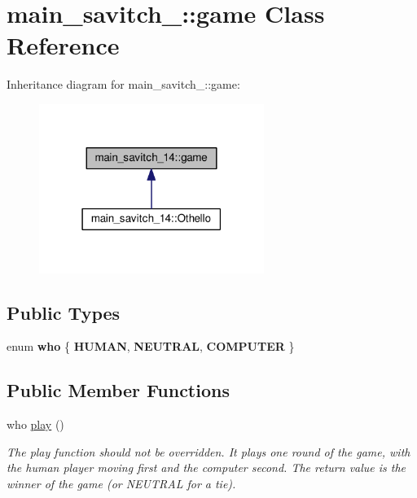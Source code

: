 \hypertarget{classmain__savitch__14_1_1game}{}\section{main\+\_\+savitch\+\_\+:\+:game Class Reference}
\label{classmain__savitch__14_1_1game}


Inheritance diagram for main\+\_\+savitch\+\_\+:\+:game\+:
\nopagebreak
\begin{figure}[H]
\begin{center}
\leavevmode
\includegraphics[width=207pt]{classmain__savitch__14_1_1game__inherit__graph}
\end{center}
\end{figure}
\subsection*{Public Types}
\begin{DoxyCompactItemize}
\item 
enum {\bfseries who} \{ {\bfseries H\+U\+M\+AN}, 
{\bfseries N\+E\+U\+T\+R\+AL}, 
{\bfseries C\+O\+M\+P\+U\+T\+ER}
 \}\hypertarget{classmain__savitch__14_1_1game_a4fe20fb287f809ae2b68e28e4ccba634}{}\label{classmain__savitch__14_1_1game_a4fe20fb287f809ae2b68e28e4ccba634}

\end{DoxyCompactItemize}
\subsection*{Public Member Functions}
\begin{DoxyCompactItemize}
\item 
who \hyperlink{classmain__savitch__14_1_1game_a4dbeaddb78059f7c5dcbf5cc4e026317}{play} ()
\begin{DoxyCompactList}\small\item\em The play function should not be overridden. It plays one round of the game, with the human player moving first and the computer second. The return value is the winner of the game (or N\+E\+U\+T\+R\+AL for a tie). \end{DoxyCompactList}\end{DoxyCompactItemize}
